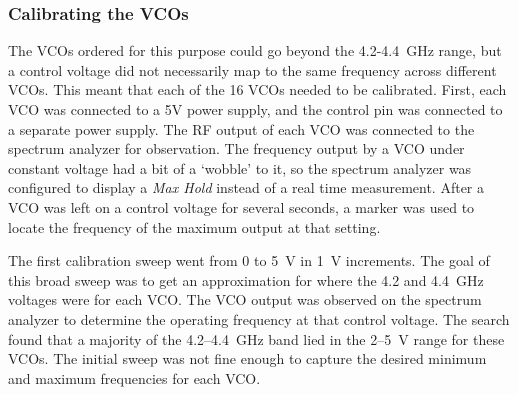 \subsubsection{Calibrating the VCOs}
The VCOs ordered for this purpose could go beyond the 4.2-4.4~GHz range, but a control voltage did not necessarily map to the same frequency across different VCOs. This meant that each of the 16 VCOs needed to be calibrated. First, each VCO was connected to a 5V power supply, and the control pin was connected to a separate power supply. The RF output of each VCO was connected to the spectrum analyzer for observation. The frequency output by a VCO under constant voltage had a bit of a `wobble' to it, so the spectrum analyzer was configured to display a \textit{Max Hold} instead of a real time measurement. After a VCO was left on a control voltage for several seconds, a marker was used to locate the frequency of the maximum output at that setting. 

The first calibration sweep went from 0 to 5~V in 1~V increments.  The goal of this broad sweep was to get an approximation for where the 4.2 and 4.4~GHz voltages were for each VCO. The VCO output was observed on the spectrum analyzer to determine the operating frequency at that control voltage. The search found that a majority of the 4.2--4.4~GHz band lied in the 2--5~V range for these VCOs. The initial sweep was not fine enough to capture the desired minimum and maximum frequencies for each VCO. 


